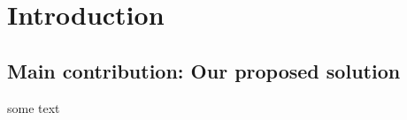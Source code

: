 \section{Introduction}





\subsection{Main contribution: Our proposed solution}

some text~\cite{Gehrke2019-og}

